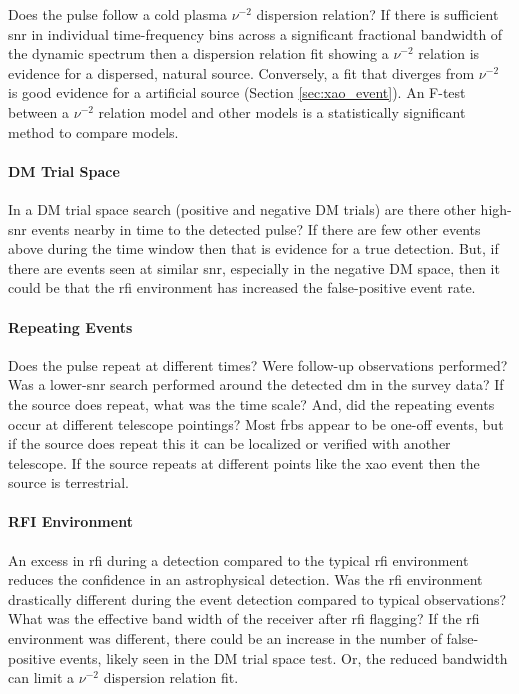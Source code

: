 \documentclass[a4paper,fleqn,usenatbib]{mnras}
\begin{document}
Does the pulse follow a cold plasma $\nu^{-2}$ dispersion relation? If there is
sufficient \gls{snr} in individual time-frequency bins across a significant
fractional bandwidth of the dynamic spectrum then a dispersion relation fit
showing a $\nu^{-2}$ relation is evidence for a dispersed, natural source.
Conversely, a fit that diverges from $\nu^{-2}$ is good evidence for a
artificial source (Section \ref{sec:xao_event}). An F-test between a $\nu^{-2}$
relation model and other models is a statistically significant method to compare
models.

\paragraph{DM Trial Space}

In a DM trial space search (positive and negative DM trials) are there other
high-\gls{snr} events nearby in time to the detected pulse? If there are few
other events above during the time window then that is evidence for a true
detection. But, if there are events seen at similar \gls{snr}, especially in the
negative DM space, then it could be that the \gls{rfi} environment has
increased the false-positive event rate.

\paragraph{Repeating Events}

Does the pulse repeat at different times? Were follow-up observations performed?
Was a lower-\gls{snr} search performed around the detected \gls{dm} in the
survey data? If the source does repeat, what was the time scale? And, did the
repeating events occur at different telescope pointings? Most \glspl{frb} appear
to be one-off events, but if the source does repeat this it can be localized or
verified with another telescope. If the source repeats at different points like
the \gls{xao} event then the source is terrestrial.

\paragraph{RFI Environment}

An excess in \gls{rfi} during a detection compared to the typical \gls{rfi}
environment reduces the confidence in an astrophysical detection.  Was the
\gls{rfi} environment drastically different during the event detection compared
to typical observations? What was the effective band width of the receiver after
\gls{rfi} flagging? If the \gls{rfi} environment was different, there could be
an increase in the number of false-positive events, likely seen in the DM trial
space test. Or, the reduced bandwidth can limit a $\nu^{-2}$ dispersion relation
fit.
\end{document}
